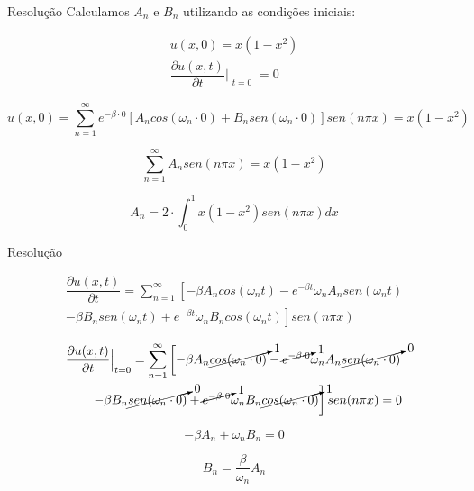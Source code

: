 \documentclass{beamer}
\begin{document}
\begin{frame}{Resolução}
Calculamos $A_n$ e $B_n$ utilizando as condições iniciais:

\begin{equation*}
\begin{matrix}
    u\left ( x, 0 \right ) = x\left ( 1-x^2 \right ) \\
    \dfrac{\partial u(x,t)}{\partial t}\Bigr|_{\substack{t=0}}  = 0
\end{matrix}
\end{equation*}

\begin{equation*}
     u(x, 0) = \sum_{n=1}^{\infty}e^{-\beta \cdot 0}\left [A_n cos (\omega_n \cdot 0) + B_n sen (\omega_n \cdot 0)\right ] sen (n \pi x) = x(1-x^2)
\end{equation*}

\begin{equation*}
     \sum_{n=1}^{\infty} A_n  sen (n \pi x) = x(1-x^2)
\end{equation*}

\begin{block}{ }

\begin{equation}
     A_n = 2 \cdot \int_{0}^{1}  x(1-x^2) sen (n \pi x) dx
\end{equation}

\end{block}

\end{frame}



\begin{frame}{Resolução}

\begin{align*}
   \dfrac{\partial u(x,t)}{\partial t} = \sum_{n=1}^{\infty} \left [-\beta A_n cos (\omega_n t) - e^{-\beta t} \omega_n A_n sen (\omega_n t) \right.\\ 
    \left . -\beta B_n sen (\omega_n t) + e^{-\beta t} \omega_n B_n cos (\omega_n t) \right ] sen (n \pi x)
\end{align*}


\begin{align*}
  \dfrac{\partial u(x,t)}{\partial t}\Bigr|_{\substack{t=0}} = \sum_{n=1}^{\infty} \left [-\beta A_n \cancelto{1}{cos (\omega_n \cdot 0)} - \cancelto{1}{e^{-\beta \cdot 0}} \omega_n A_n \cancelto{0}{sen (\omega_n \cdot 0)} \right.\\ 
    \left . -\beta B_n \cancelto{0}{sen (\omega_n \cdot 0)} + \cancelto{1}{e^{-\beta \cdot 0}} \omega_n B_n \cancelto{1}{cos (\omega_n \cdot 0)} \right ] sen (n \pi x) = 0
\end{align*}

\begin{equation*}
    -\beta A_n + \omega_n B_n = 0
\end{equation*}

\begin{block}{ }
\begin{equation}
    B_n = \dfrac{\beta}{\omega_n}A_n
\end{equation}
\end{block}

\end{frame}
\end{document}
